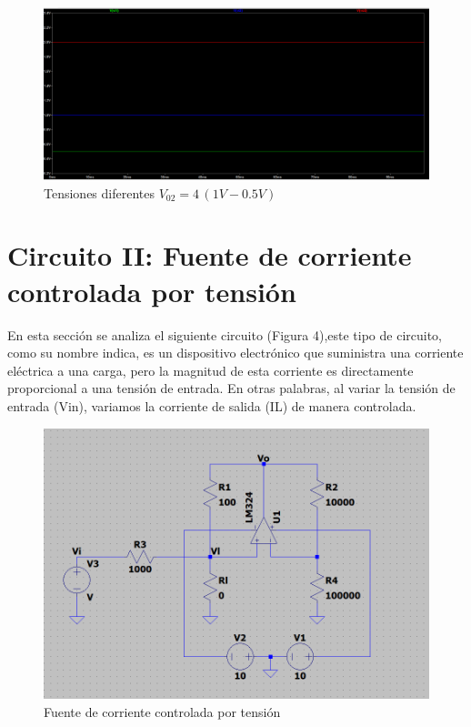 \documentclass[12pt]{article}
\begin{document}
		\begin{figure}[h]
			\centering
			\includegraphics[width=1\linewidth]{Simulaciones-Resultados/Circuito1_Vo2-Vi1-Vi2}
			\caption{Tensiones diferentes $V_{02}=4\,(1V-0.5V)$}
			\label{fig:circuito1vo2-vi1-vi2}
		\end{figure}
			
	\section {Circuito II: Fuente de corriente controlada por tensión}
		En esta sección se analiza el siguiente circuito (Figura 4),este tipo de circuito, como su nombre indica, es un dispositivo electrónico que suministra una corriente eléctrica a una carga, pero la magnitud de esta corriente es directamente proporcional a una tensión de entrada. En otras palabras, al variar la tensión de entrada (Vin), variamos la corriente de salida (IL) de manera controlada.
		
		\begin{figure}[h]
			\centering
			\includegraphics[width=1\linewidth]{Simulaciones-Resultados/Circuito2_esquematico}
			\caption{Fuente de corriente controlada por tensión}
			\label{fig:circuito2esquematico}
		\end{figure}
\end{document}

